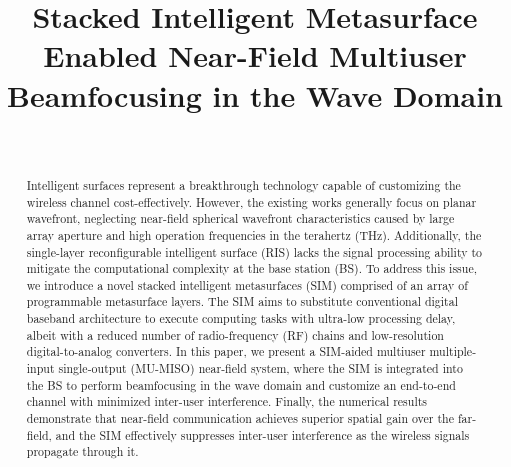 \documentclass[conference]{IEEEtran}
\theoremstyle{remark}
\begin{document}
\title{ Stacked Intelligent Metasurface Enabled Near-Field Multiuser Beamfocusing in the Wave Domain}

\author{
 \\
}

\maketitle

\begin{abstract}
Intelligent surfaces represent a breakthrough technology capable of customizing the wireless channel cost-effectively. However, the existing works generally focus on planar wavefront, neglecting near-field spherical wavefront characteristics caused by large array aperture and high operation frequencies in the terahertz (THz). Additionally, the single-layer reconfigurable intelligent surface (RIS) lacks the signal processing ability to mitigate the computational complexity at the base station (BS). To address this issue, we introduce a novel stacked intelligent metasurfaces (SIM) comprised of an array of programmable metasurface layers. The SIM aims to substitute conventional digital baseband architecture to execute computing tasks with ultra-low processing delay, albeit with a reduced number of radio-frequency (RF) chains and low-resolution digital-to-analog converters. In this paper, we present a SIM-aided multiuser multiple-input single-output (MU-MISO) near-field system, where the SIM is integrated into the BS to perform beamfocusing in the wave domain and customize an end-to-end channel with minimized inter-user interference.
Finally, the numerical results demonstrate that near-field communication achieves superior spatial gain over the far-field, and the SIM effectively suppresses inter-user interference as the wireless signals propagate through it.
\end{abstract}
\end{document}
